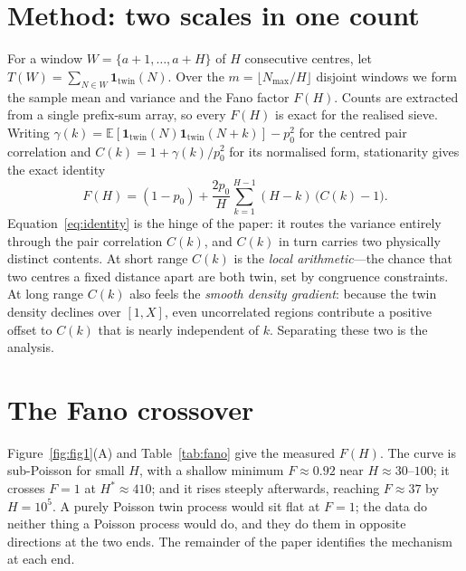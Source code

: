 \documentclass[11pt]{article}
\theoremstyle{definition}
\newcommand{\twin}{\mathrm{twin}}
\newcommand{\E}{\mathbb{E}}
\begin{document}
\section{Method: two scales in one count}
For a window $W=\{a+1,\dots,a+H\}$ of $H$ consecutive centres, let
$T(W)=\sum_{N\in W}\mathbf{1}_{\twin}(N)$. Over the $m=\lfloor N_{\max}/H\rfloor$ disjoint windows we
form the sample mean and variance and the Fano factor $F(H)$. Counts are extracted from a single
prefix-sum array, so every $F(H)$ is exact for the realised sieve. Writing
$\gamma(k)=\E[\mathbf{1}_{\twin}(N)\mathbf{1}_{\twin}(N+k)]-p_{0}^{2}$ for the centred pair
correlation and $C(k)=1+\gamma(k)/p_{0}^{2}$ for its normalised form, stationarity gives the exact
identity
\begin{equation}
F(H)=(1-p_{0})+\frac{2p_{0}}{H}\sum_{k=1}^{H-1}(H-k)\,\bigl(C(k)-1\bigr).
\label{eq:identity}
\end{equation}
Equation~\eqref{eq:identity} is the hinge of the paper: it routes the variance entirely through the
pair correlation $C(k)$, and $C(k)$ in turn carries two physically distinct contents. At short range
$C(k)$ is the \emph{local arithmetic}---the chance that two centres a fixed distance apart are both
twin, set by congruence constraints. At long range $C(k)$ also feels the \emph{smooth density
gradient}: because the twin density declines over $[1,X]$, even uncorrelated regions contribute a
positive offset to $C(k)$ that is nearly independent of $k$. Separating these two is the analysis.

\section{The Fano crossover}
Figure~\ref{fig:fig1}(A) and Table~\ref{tab:fano} give the measured $F(H)$. The curve is sub-Poisson
for small $H$, with a shallow minimum $F\approx0.92$ near $H\approx30$--$100$; it crosses $F=1$ at
$H^{\ast}\approx410$; and it rises steeply afterwards, reaching $F\approx37$ by $H=10^{5}$. A purely
Poisson twin process would sit flat at $F=1$; the data do neither thing a Poisson process would do,
and they do them in opposite directions at the two ends. The remainder of the paper identifies the
mechanism at each end.
\end{document}
